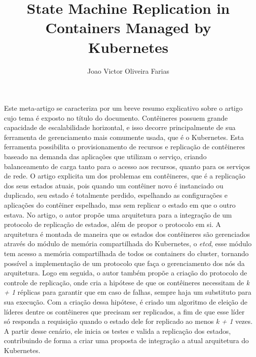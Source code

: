 \documentclass[12pt]{article}
\title{State Machine Replication in Containers Managed by Kubernetes}
\author{Joao Victor Oliveira Farias}
\begin{document}
 

\maketitle

\begin{abstract}
  
\end{abstract}
     
\begin{resumo} 
  Este meta-artigo se caracteriza por um breve resumo explicativo sobre o artigo cujo tema é exposto no título do documento. Contêineres possuem grande capacidade de escalabilidade horizontal, e isso decorre principalmente de sua ferramenta de gerenciamento mais comumente usada, que é o Kubernetes. Esta ferramenta possibilita o provisionamento de recursos e replicação de contêineres baseado na demanda das aplicações que utilizam o serviço, criando balanceamento de carga tanto para o acesso aos recursos, quanto para os serviços de rede. O artigo explicita um dos problemas em contêineres, que é a replicação dos seus estados atuais, pois quando um contêiner novo é instanciado ou duplicado, seu estado é totalmente perdido, espelhando as configurações e aplicações do contêiner espelhado, mas sem replicar o estado em que o outro estava. No artigo, o autor propõe uma arquitetura para a integração de um protocolo de replicação de estados, além de propor o protocolo em si. A arquitetura é montada de maneira que os estados dos contêineres são gerenciados através do módulo de memória compartilhada do Kubernetes, o \textit{etcd}, esse módulo tem acesso a memória compartilhada de todos os containers do cluster, tornando possível a implementação de um protocolo que faça o gerenciamento dos nós da arquitetura. Logo em seguida, o autor também propõe a criação do protocolo de controle de replicação, onde cria a hipótese de que os contêineres necessitam de \textit{k + 1} réplicas para garantir que em caso de falhas, sempre haja um substituto para sua execução. Com a criação dessa hipótese, é criado um algoritmo de eleição de líderes dentre os contêineres que precisam ser replicados, a fim de que esse líder só responda a requisição quando o estado dele for replicado ao menos \textit{k + 1} vezes. A partir desse cenário, ele inicia os testes e valida a replicação dos estados, contribuindo de forma a criar uma proposta de integração a atual arquitetura do Kubernetes.\cite{netto2017state}
\end{resumo}




\end{document}
